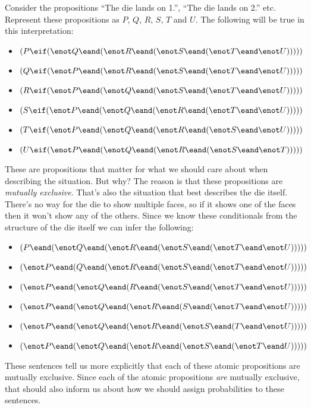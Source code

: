 Consider the propositions ``The die lands on 1.'', ``The die lands on 2.'' etc. Represent these propositions as $P$, $Q$, $R$, $S$, $T$ and $U$. The following will be true in this interpretation:
\begin{itemize}
  \item $(P\eif(\enot Q \eand (\enot R \eand (\enot S \eand (\enot T \eand \enot U)))))$
  \item $(Q\eif(\enot P \eand (\enot R \eand (\enot S \eand (\enot T \eand \enot U)))))$
  \item $(R\eif(\enot P \eand (\enot Q \eand (\enot S \eand (\enot T \eand \enot U)))))$
  \item $(S\eif(\enot P \eand (\enot Q \eand (\enot R \eand (\enot T \eand \enot U)))))$
  \item $(T\eif(\enot P \eand (\enot Q \eand (\enot R \eand (\enot S \eand \enot U)))))$
  \item $(U\eif(\enot P \eand (\enot Q \eand (\enot R \eand (\enot S \eand \enot T)))))$
\end{itemize}
These are propositions that matter for what we should care about when describing the situation. But why? The reason is that these propositions are \emph{mutually exclusive}. That's also the situation that best describes the die itself. There's no way for the die to show multiple faces, so if it shows one of the faces then it won't show any of the others. Since we know these conditionals from the structure of the die itself we can infer the following:
\begin{itemize}
  \item $(P\eand(\enot Q \eand (\enot R \eand (\enot S \eand (\enot T \eand \enot U)))))$
  \item $(\enot P\eand(Q \eand (\enot R \eand (\enot S \eand (\enot T \eand \enot U)))))$
  \item $(\enot P\eand(\enot Q \eand (R \eand (\enot S \eand (\enot T \eand \enot U)))))$
  \item $(\enot P\eand(\enot Q \eand (\enot R \eand (S \eand (\enot T \eand \enot U)))))$
  \item $(\enot P\eand(\enot Q \eand (\enot R \eand (\enot S \eand (T \eand \enot U)))))$
  \item $(\enot P\eand(\enot Q \eand (\enot R \eand (\enot S \eand (\enot T \eand U)))))$
\end{itemize}
These sentences tell us more explicitly that each of these atomic propositions are mutually exclusive. Since each of the atomic propositions \emph{are} mutually exclusive, that should also inform us about how we should assign probabilities to these sentences.

